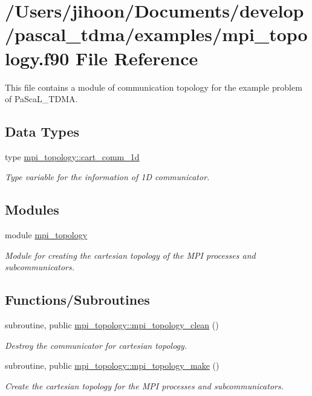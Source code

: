 \hypertarget{mpi__topology_8f90}{}\section{/\+Users/jihoon/\+Documents/develop/pascal\+\_\+tdma/examples/mpi\+\_\+topology.f90 File Reference}
\label{mpi__topology_8f90}


This file contains a module of communication topology for the example problem of Pa\+Sca\+L\+\_\+\+T\+D\+MA.  


\subsection*{Data Types}
\begin{DoxyCompactItemize}
\item 
type \mbox{\hyperlink{structmpi__topology_1_1cart__comm__1d}{mpi\+\_\+topology\+::cart\+\_\+comm\+\_\+1d}}
\begin{DoxyCompactList}\small\item\em Type variable for the information of 1D communicator. \end{DoxyCompactList}\end{DoxyCompactItemize}
\subsection*{Modules}
\begin{DoxyCompactItemize}
\item 
module \mbox{\hyperlink{namespacempi__topology}{mpi\+\_\+topology}}
\begin{DoxyCompactList}\small\item\em Module for creating the cartesian topology of the M\+PI processes and subcommunicators. \end{DoxyCompactList}\end{DoxyCompactItemize}
\subsection*{Functions/\+Subroutines}
\begin{DoxyCompactItemize}
\item 
subroutine, public \mbox{\hyperlink{namespacempi__topology_aa14e91baaec6d1c1082ebd5ac6e19128}{mpi\+\_\+topology\+::mpi\+\_\+topology\+\_\+clean}} ()
\begin{DoxyCompactList}\small\item\em Destroy the communicator for cartesian topology. \end{DoxyCompactList}\item 
subroutine, public \mbox{\hyperlink{namespacempi__topology_a8819f16f50aded913f17520a29d3ec4c}{mpi\+\_\+topology\+::mpi\+\_\+topology\+\_\+make}} ()
\begin{DoxyCompactList}\small\item\em Create the cartesian topology for the M\+PI processes and subcommunicators. \end{DoxyCompactList}\end{DoxyCompactItemize}
